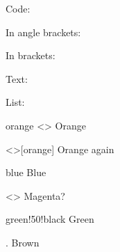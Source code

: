 \documentclass[a4paper, 11pt]{article}
\begin{document}
\begin{example}{}
    \noindent Code: \texttt{\opttype}\par
    In angle brackets: \texttt{\angleopts}\par
    In brackets: \texttt{\bracketopts}\par
    Text: \texttt{\body}\par
\end{example}

\begin{example}{}

    \begingroup
    \color{brown}
    List:
    \begin{boxedlist}
        \item[orange]<\ttfamily> Orange  %
        \item<\ttfamily>[orange] Orange again %
        \item[blue] Blue  %
        \item<> Magenta?  %
        \item[green!50!black] Green  %
        \item[.] Brown  %
    \end{boxedlist}
    \endgroup
\end{example}

\printindex
\end{document}
